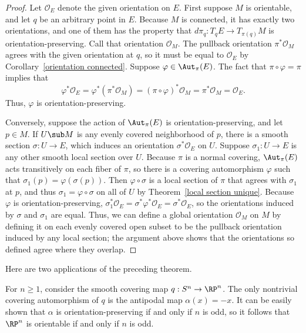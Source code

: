 \begin{proof}
Let $\mathcal{O}_E$ denote the given orientation on $E$. First suppose $M$ is orientable, and let $q$ be an arbitrary point in $E$. Because $M$ is connected, it has exactly two orientations, and one of them has the property that $d\pi_q:T_qE\to T_{\pi(q)}M$ is orientation-preserving. Call that orientation $\mathcal{O}_M$. The pullback orientation $\pi^*\mathcal{O}_M$ agrees with the given orientation at $q$, so it must be equal to $\mathcal{O}_E$ by Corollary~\ref{orientation connected}. Suppose $\varphi\in\Aut_\pi(E)$. The fact that $\pi\circ\varphi=\pi$ implies that
\[\varphi^*\mathcal{O}_E=\varphi^*(\pi^*\mathcal{O}_M)=(\pi\circ\varphi)^*\mathcal{O}_M=\pi^*\mathcal{O}_M=\mathcal{O}_E.\]
Thus, $\varphi$ is orientation-preserving.\par
Conversely, suppose the action of $\Aut_\pi(E)$ is orientation-preserving, and let $p\in M$. If $U\sub M$ is any evenly covered neighborhood of $p$, there is a smooth section $\sigma:U\to E$, which induces an orientation $\sigma^*\mathcal{O}_E$ on $U$. Suppose $\sigma_1:U\to E$ is any other smooth local section over $U$. Because $\pi$ is a normal covering, $\Aut_\pi(E)$ acts transitively on each fiber of $\pi$, so there is a covering automorphism $\varphi$ such that $\sigma_1(p)=\varphi(\sigma(p))$. Then $\varphi\circ\sigma$ is a local section of $\pi$ that agrees with $\sigma_1$ at $p$, and thus $\sigma_1=\varphi\circ\sigma$ on all of $U$ by Theorem~\ref{local section unique}. Because $\varphi$ is orientation-preserving, $\sigma_1^*\mathcal{O}_E=\sigma^*\varphi^*\mathcal{O}_E=\sigma^*\mathcal{O}_E$, so the orientations induced by $\sigma$ and $\sigma_1$ are equal. Thus, we can define a global orientation $\mathcal{O}_M$ on $M$ by defining it on each evenly covered open subset to be the pullback orientation induced by any local section; the argument above shows that the orientations so defined agree where they overlap.
\end{proof}
Here are two applications of the preceding theorem.
\begin{example}
For $n\geq1$, consider the smooth covering map $q:S^n\to\RP^n$. The only nontrivial covering automorphism of $q$ is the antipodal map $\alpha(x)=-x$. It can be easily shown that $\alpha$ is orientation-preserving if and only if $n$ is odd, so it follows that $\RP^n$ is orientable if and only if $n$ is odd.
\end{example}
